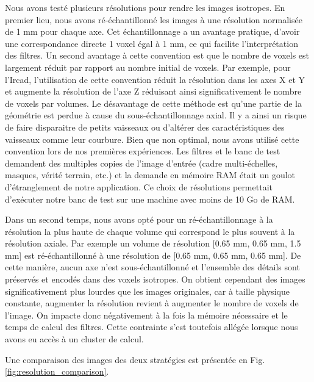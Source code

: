 Nous avons testé plusieurs résolutions pour rendre les images isotropes. En premier lieu, nous avons ré-échantillonné les images à une résolution normalisée de 1 mm pour chaque axe. Cet échantillonnage a un avantage pratique, d'avoir une correspondance directe 1 voxel égal à 1 mm, ce qui facilite l'interprétation des filtres. Un second avantage à cette convention est que le nombre de voxels est largement réduit par rapport au nombre initial de voxels.
Par exemple, pour l'Ircad, l'utilisation de cette convention  réduit la résolution dans les axes X et Y et augmente la résolution de l'axe Z réduisant ainsi significativement le nombre de voxels par volumes. Le désavantage de cette méthode est qu'une partie de la géométrie est perdue à cause du sous-échantillonnage axial. Il y a ainsi un risque de faire disparaitre de petits vaisseaux ou d'altérer des caractéristiques des vaisseaux comme leur courbure.  Bien que non optimal, nous avons utilisé cette convention lors de nos premières expériences. Les filtres et le banc de test demandent des multiples copies de l'image d'entrée (cadre multi-échelles, masques, vérité terrain, etc.) et la demande en mémoire RAM était un goulot d'étranglement de notre application. Ce choix de résolutions permettait d'exécuter notre banc de test sur une machine avec moins de 10 Go de RAM.

Dans un second temps, nous avons opté pour un ré-échantillonnage à la résolution la plus haute de chaque volume qui correspond le plus souvent à la résolution axiale. Par exemple un volume de résolution [0.65 mm, 0.65 mm, 1.5 mm] est ré-échantillonné à une résolution de [0.65 mm, 0.65 mm, 0.65 mm]. De cette manière, aucun axe n'est sous-échantillonné et l'ensemble des détails sont préservés et encodés dans des voxels isotropes. On obtient cependant des images significativement plus lourdes que les images originales, car à taille physique constante, augmenter la résolution revient à augmenter le nombre de voxels de l'image. On impacte donc négativement à la fois la mémoire nécessaire et le temps de calcul des filtres. Cette contrainte s'est toutefois allégée lorsque nous avons eu accès à un cluster de calcul.

Une comparaison des images des deux stratégies est présentée en Fig. \ref{fig:resolution_comparison}.

